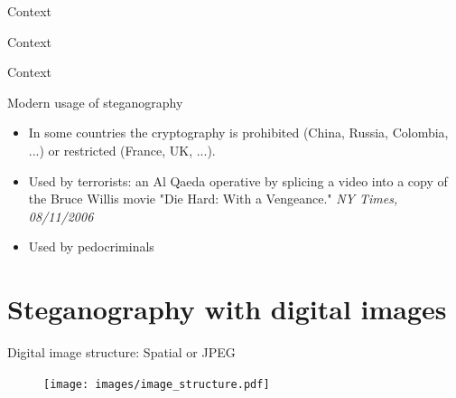 \documentclass[10pt]{beamer}
\begin{document}
\begin{frame}{Context}
\end{frame}

\begin{frame}{Context}
\begin{figure}[h]
\end{figure}
\end{frame}

\begin{frame}{Context}
\begin{figure}[h]
\end{figure}
\end{frame}

\begin{frame}{Modern usage of steganography}
\begin{itemize}
    \item In some countries the cryptography is prohibited (China, Russia, Colombia, ...) or restricted (France, UK, ...). 
    \item Used by terrorists: an Al Qaeda operative by splicing a video into a copy of the Bruce Willis movie "Die Hard:
    With a Vengeance." \textit{NY Times, 08/11/2006}
    \item Used by pedocriminals
\end{itemize}
\end{frame}




\section{Steganography with digital images}



\begin{frame}{Digital image structure: Spatial or JPEG}

\begin{figure}[h]
\texttt{[image: images/image\_structure.pdf]}
\end{figure}
\end{frame}
\end{document}
